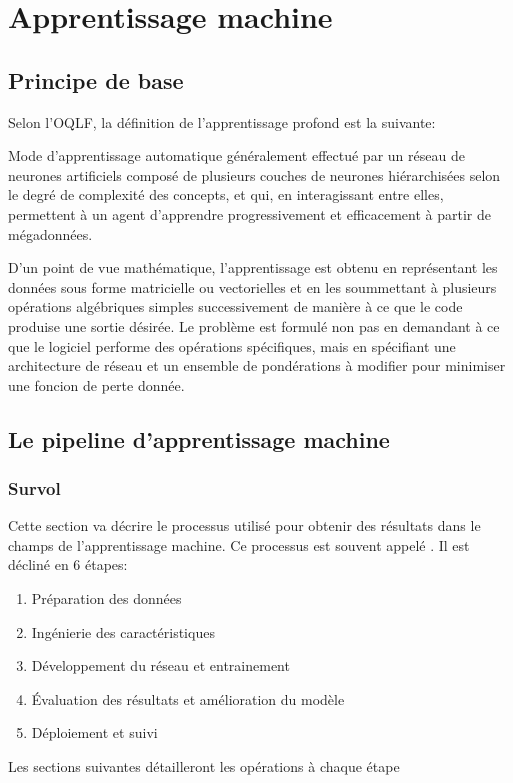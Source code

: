 \section{Apprentissage machine}
  \subsection{Principe de base}
    Selon l'\ac{OQLF}\parencite{OQLF:ApprentissageProfond:2024}, la définition de l'apprentissage profond est la suivante:
    \begin{definition}
    Mode d'apprentissage automatique généralement effectué par un réseau de neurones artificiels composé de plusieurs couches de neurones hiérarchisées selon le degré de complexité des concepts, et qui, en interagissant entre elles, permettent à un agent d'apprendre progressivement et efficacement à partir de mégadonnées.
    \end{definition}
    D'un point de vue mathématique, l'apprentissage est obtenu en représentant les données sous forme matricielle ou vectorielles et en les soummettant à plusieurs opérations algébriques simples successivement de manière à ce que le code produise une sortie désirée. Le problème est formulé non pas en demandant à ce que le logiciel performe des opérations spécifiques, mais en spécifiant une architecture de réseau et un ensemble de pondérations à modifier pour minimiser une foncion de perte donnée.
  \subsection{Le pipeline d'apprentissage machine}
  \subsubsection{Survol}
      Cette section va décrire le processus utilisé pour obtenir des résultats dans le champs de l'apprentissage machine. Ce processus est souvent appelé  \fg{}. Il est décliné en 6 étapes:
        \begin{enumerate}
          \item Préparation des données
          \item Ingénierie des caractéristiques
          \item Développement du réseau et entrainement
          \item Évaluation des résultats et amélioration du modèle
          \item Déploiement et suivi
        \end{enumerate}
      Les sections suivantes détailleront les opérations à chaque étape
